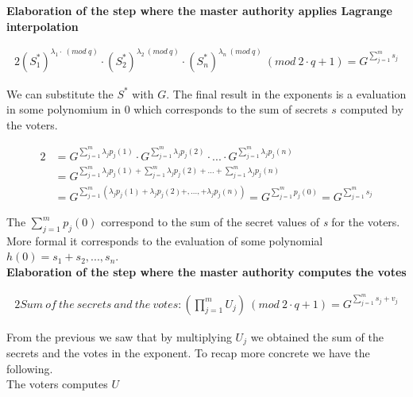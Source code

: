 \noindent
\textbf{Elaboration of the step where the master authority applies Lagrange interpolation}


\begin{alignat*}{2}
(S_1^*)^{\lambda_1  \cdot  \ (mod \ q)}  \cdot  (S_2^*)^{\lambda_2 \ (mod \ q)}  \cdot  (S_n^*)^{\lambda_n \ (mod \ q)} \ (mod \ 2 \cdot q+1) = G^{ \sum\limits_{j=1}^m s_j}
\end{alignat*}


\noindent
We can substitute the $S^*$ with $G$. The final result in the exponents is a evaluation in some polynomium in $0$ which corresponds to the sum of secrets $s$ computed by the voters.

\begin{alignat*}{2}
&=G^{ \sum\limits_{j=1}^m \lambda_j p_j(1)} \cdot G^{ \sum\limits_{j=1}^m \lambda_j p_j(2)} \cdot...\cdot G^{ \sum\limits_{j=1}^m \lambda_j p_j(n)}\\
&=G^{ \sum\limits_{j=1}^m \lambda_j p_j(1) +  \sum\limits_{j=1}^m \lambda_j p_j(2) +...+  \sum\limits_{j=1}^m \lambda_j p_j(n)}\\
&=G^{ \sum\limits_{j=1}^m (\lambda_j p_j(1)+\lambda_j p_j(2)+,...,+\lambda_{j}p_j(n))} = G^{ \sum\limits_{j=1}^m p_j(0)}= G^{ \sum\limits_{j=1}^m s_j}
\end{alignat*}


\noindent
The \begin{math}\sum\limits_{j=1}^m p_j(0) \end{math} correspond to the sum of the secret values of \textit{s} for the voters. More formal it corresponds to the evaluation of some polynomial $h(0)= s_1 + s_2,..., s_n$.\\

\noindent
\textbf{Elaboration of the step where the master authority computes the votes}

\begin{alignat*}{2}
Sum \ of \ the \ secrets \ and \ the \  votes: (\prod\limits_{j=1}^{m} U_{j}) \ (mod \ 2 \cdot q+1)=  G^{ \sum\limits_{j=1}^m s_j +v_j}
\end{alignat*}

\noindent
From the previous we saw that by multiplying \begin{math}U_j \end{math} we obtained the sum of the secrets and the votes in the exponent. To recap more concrete we have the following. \\

\noindent
The voters computes $U$


